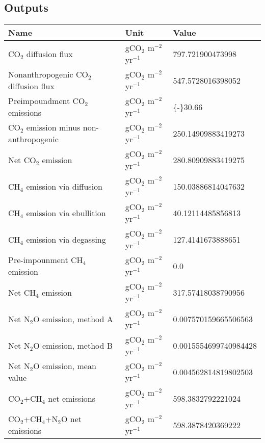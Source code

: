 \documentclass{article}%
\begin{document}
%
\subsection{Outputs}%
\label{subsec:Outputs}%
\begin{center}%
\renewcommand{\arraystretch}{1.0}%
\begin{tabu}{@{}p{10cm} X[c] X[l]@{}}%
\toprule%
\textbf{Name}&\textbf{Unit}&\textbf{Value}\\%
\midrule%
CO$_2$ diffusion flux&gCO$_2$ m$^{-2}$ yr$^{-1}$&\num[round-precision=4,round-mode=figures]{797.721900473998}\\%
Nonanthropogenic CO$_2$ diffusion flux&gCO$_2$ m$^{-2}$ yr$^{-1}$&\num[round-precision=4,round-mode=figures]{547.5728016398052}\\%
Preimpoundment CO$_2$ emissions&gCO$_2$ m$^{-2}$ yr$^{-1}$&\num[round-precision=4,round-mode=figures]{{-}30.66}\\%
CO$_2$ emission minus non-anthropogenic&gCO$_2$ m$^{-2}$ yr$^{-1}$&\num[round-precision=4,round-mode=figures]{250.14909883419273}\\%
Net CO$_2$ emission&gCO$_2$ m$^{-2}$ yr$^{-1}$&\num[round-precision=4,round-mode=figures]{280.80909883419275}\\%
CH$_4$ emission via diffusion&gCO$_2$ m$^{-2}$ yr$^{-1}$&\num[round-precision=4,round-mode=figures]{150.03886814047632}\\%
CH$_4$ emission via ebullition&gCO$_2$ m$^{-2}$ yr$^{-1}$&\num[round-precision=4,round-mode=figures]{40.12114485856813}\\%
CH$_4$ emission via degassing&gCO$_2$ m$^{-2}$ yr$^{-1}$&\num[round-precision=4,round-mode=figures]{127.4141673888651}\\%
Pre-impounment CH$_4$ emission&gCO$_2$ m$^{-2}$ yr$^{-1}$&\num[round-precision=4,round-mode=figures]{0.0}\\%
Net CH$_4$ emission&gCO$_2$ m$^{-2}$ yr$^{-1}$&\num[round-precision=4,round-mode=figures]{317.57418038790956}\\%
Net N$_2$O emission, method A&gCO$_2$ m$^{-2}$ yr$^{-1}$&\num[round-precision=4,round-mode=figures]{0.007570159665506563}\\%
Net N$_2$O emission, method B&gCO$_2$ m$^{-2}$ yr$^{-1}$&\num[round-precision=4,round-mode=figures]{0.0015554699740984428}\\%
Net N$_2$O emission, mean value&gCO$_2$ m$^{-2}$ yr$^{-1}$&\num[round-precision=4,round-mode=figures]{0.004562814819802503}\\%
\midrule%
CO$_2$+CH$_4$ net emissions&gCO$_2$ m$^{-2}$ yr$^{-1}$&\num[round-precision=4,round-mode=figures]{598.3832792221024}\\%
\midrule%
CO$_2$+CH$_4$+N$_2$O net emissions&gCO$_2$ m$^{-2}$ yr$^{-1}$&\num[round-precision=4,round-mode=figures]{598.3878420369222}\\\bottomrule%
%
\end{tabu}%
\end{center}%
\end{document}

